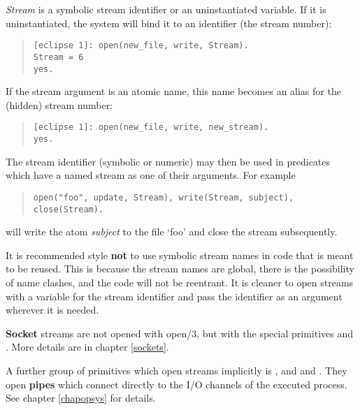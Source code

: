 {\it Stream} is a symbolic stream identifier or an uninstantiated variable.
If it is uninstantiated, the system will bind it to an identifier (the stream
number):
\begin{quote}\begin{verbatim}
[eclipse 1]: open(new_file, write, Stream).
Stream = 6
yes.
\end{verbatim}\end{quote}
If the stream argument is an atomic name, this name becomes an alias
for the (hidden) stream number:
\begin{quote}\begin{verbatim}
[eclipse 1]: open(new_file, write, new_stream).
yes.
\end{verbatim}\end{quote}
The stream identifier (symbolic or numeric) may then be used in predicates
which have a named stream as one of their arguments. For example
\begin{quote}\begin{verbatim}
open("foo", update, Stream), write(Stream, subject), close(Stream).
\end{verbatim}\end{quote}
will write the atom
{\it subject} to the file `foo' and close the stream subsequently.


It is recommended style {\bf not} to use symbolic stream names in code that is
meant to be reused. This is because the stream names are global,
there is the possibility of name clashes, and the code will not be reentrant.
It is cleaner to open streams with a variable for the stream identifier
and pass the identifier as an argument wherever it is needed.


{\bf Socket} streams are not opened with open/3, but with the special primitives
 and
.
More details are in chapter \ref{sockets}.


A further group of primitives which open streams implicitly is
,
 and
and .
They open {\bf pipes} which connect directly to the I/O channels of the
executed process. See chapter \ref{chapopsys} for details.



